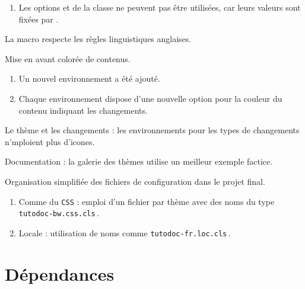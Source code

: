 {\begin{tdocnew}
\begin{enumerate}
		\item Les options  et  de la classe  ne peuvent pas être utilisées, car leurs valeurs sont fixées par \thisproj.
	\end{enumerate}

	\item La macro  respecte les règles linguistiques anglaises.

	\item Mise en avant colorée de contenus.
	\begin{enumerate}
		\item Un nouvel environnement  a été ajouté.

		\item Chaque environnement dispose d'une nouvelle option  pour la couleur du contenu indiquant les changements.
	\end{enumerate}
\end{tdocnew}


\begin{tdocupdate}
	\item Le thème  et les changements : les environnements pour les types de changements n'mploient plus d'icones.

	\item Documentation : la galerie des thèmes utilise un meilleur exemple factice.
\end{tdocupdate}



\begin{tdoctech}
	\item Organisation simplifiée des fichiers de configuration dans le projet final.
	\begin{enumerate}
		\item Comme du \texttt{CSS} : emploi d'un fichier par thème avec des noms du type \texttt{tutodoc-bw.css.cls}\,.


		\item Locale : utilisation de noms comme \texttt{tutodoc-fr.loc.cls}\,.
	\end{enumerate}
\end{tdoctech}
}


\newpage
\tableofcontents
\newpage


\section{Dépendances}

